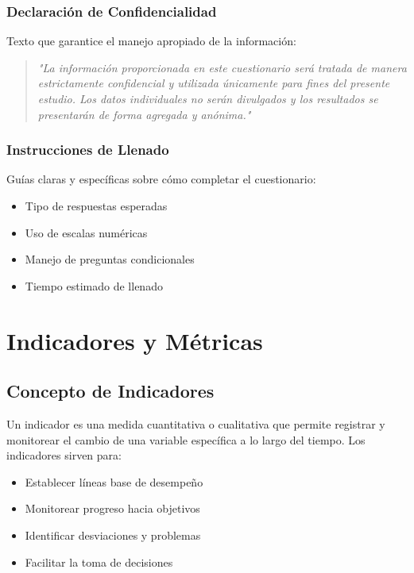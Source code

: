 \documentclass[12pt,letterpaper,oneside]{book}
\begin{document}
\subsubsection{Declaración de Confidencialidad}

Texto que garantice el manejo apropiado de la información:

\begin{quote}
\textit{"La información proporcionada en este cuestionario será tratada de manera estrictamente confidencial y utilizada únicamente para fines del presente estudio. Los datos individuales no serán divulgados y los resultados se presentarán de forma agregada y anónima."}
\end{quote}

\subsubsection{Instrucciones de Llenado}

Guías claras y específicas sobre cómo completar el cuestionario:

\begin{itemize}
\item Tipo de respuestas esperadas
\item Uso de escalas numéricas
\item Manejo de preguntas condicionales
\item Tiempo estimado de llenado
\end{itemize}

\section{Indicadores y Métricas}

\subsection{Concepto de Indicadores}

Un indicador es una medida cuantitativa o cualitativa que permite registrar y monitorear el cambio de una variable específica a lo largo del tiempo. Los indicadores sirven para:

\begin{itemize}
\item Establecer líneas base de desempeño
\item Monitorear progreso hacia objetivos
\item Identificar desviaciones y problemas
\item Facilitar la toma de decisiones
\end{itemize}
\end{document}
